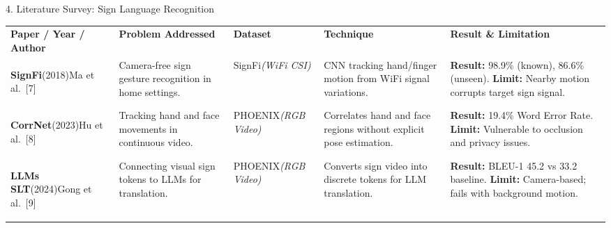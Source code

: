 \documentclass[aspectratio=169,11pt,xcolor=table]{beamer}
\begin{document}
\begin{frame}[t]{4. Literature Survey: Sign Language Recognition}

\vspace{-0.1cm} %
\centering
\fontsize{5.5}{6.5}\selectfont
\renewcommand{\arraystretch}{1.05} %
\setlength{\tabcolsep}{3pt}

\begin{tabular}{
>{\bfseries\RaggedRight\arraybackslash}m{}
>{\RaggedRight\arraybackslash}m{}
>{\RaggedRight\arraybackslash}m{}
>{\RaggedRight\arraybackslash}m{}
>{\RaggedRight\arraybackslash}m{} %
}

\rowcolor{AmritaMaroon}
{\color{white}\textbf{Paper / Year / Author}} &
{\color{white}\textbf{Problem Addressed}} &
{\color{white}\textbf{Dataset}} &
{\color{white}\textbf{Technique}} &
{\color{white}\textbf{Result \& Limitation}} \\

\arrayrulecolor{white}\hline

\rowcolor{LightBlue}
\textbf{SignFi}\newline \textnormal{(2018)}\newline \textnormal{Ma et al.~[7]} &
Camera-free sign gesture recognition in home settings. &
SignFi\newline\textit{(WiFi CSI)} &
CNN tracking hand/finger motion from WiFi signal variations. &
\textbf{Result:} 98.9\% (known), 86.6\% (unseen).\newline
\textbf{Limit:} Nearby motion corrupts target sign signal. \\

\hline

\rowcolor{LightGreen}
\textbf{CorrNet}\newline \textnormal{(2023)}\newline \textnormal{Hu et al.~[8]} &
Tracking hand and face movements in continuous video. &
PHOENIX\newline\textit{(RGB Video)} &
Correlates hand and face regions without explicit pose estimation. &
\textbf{Result:} 19.4\% Word Error Rate.\newline
\textbf{Limit:} Vulnerable to occlusion and privacy issues. \\

\hline

\rowcolor{LightCyan}
\textbf{LLMs SLT}\newline \textnormal{(2024)}\newline \textnormal{Gong et al.~[9]} &
Connecting visual sign tokens to LLMs for translation. &
PHOENIX\newline\textit{(RGB Video)} &
Converts sign video into discrete tokens for LLM translation. &
\textbf{Result:} BLEU-1 45.2 vs 33.2 baseline.\newline
\textbf{Limit:} Camera-based; fails with background motion. \\


\end{tabular}
\end{frame}
\end{document}
